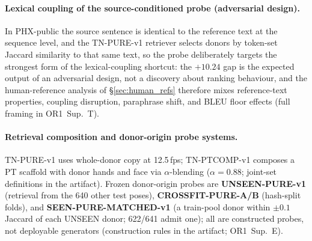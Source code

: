 \documentclass[pdflatex,sn-chicago]{sn-jnl}
\begin{document}
\paragraph{Lexical coupling of the source-conditioned probe (adversarial design).}
In PHX-public the source sentence is identical to the reference text at the sequence level, and the TN-PURE-v1 retriever selects donors by token-set Jaccard similarity to that same text, so the probe deliberately targets the strongest form of the lexical-coupling shortcut: the $+10.24$ gap is the expected output of an adversarial design, not a discovery about ranking behaviour, and the human-reference analysis of \S\ref{sec:human_refs} therefore mixes reference-text properties, coupling disruption, paraphrase shift, and BLEU floor effects (full framing in OR1~Sup.~T).

\paragraph{Retrieval composition and donor-origin probe systems.}
TN-PURE-v1 uses whole-donor copy at 12.5\,fps; TN-PTCOMP-v1 composes a PT scaffold with donor hands and face via $\alpha$-blending ($\alpha{=}0.88$; joint-set definitions in the artifact). Frozen donor-origin probes are \textbf{UNSEEN-PURE-v1} (retrieval from the 640 other test poses), \textbf{CROSSFIT-PURE-A/B} (hash-split folds), and \textbf{SEEN-PURE-MATCHED-v1} (a train-pool donor within $\pm0.1$ Jaccard of each UNSEEN donor; 622/641 admit one); all are constructed probes, not deployable generators (construction rules in the artifact; OR1~Sup.~E).
\end{document}
